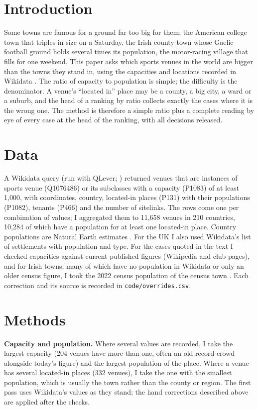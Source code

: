 \documentclass[11pt,a4paper]{article}
\begin{document}
\section{Introduction}
Some towns are famous for a ground far too big for them: the American college town that triples in size on a Saturday, the Irish county town whose Gaelic football ground holds several times its population, the motor-racing village that fills for one weekend. This paper asks which sports venues in the world are bigger than the towns they stand in, using the capacities and locations recorded in Wikidata \citep{vrandecic2014}. The ratio of capacity to population is simple; the difficulty is the denominator. A venue's ``located in'' place may be a county, a big city, a ward or a suburb, and the head of a ranking by ratio collects exactly the cases where it is the wrong one. The method is therefore a simple ratio plus a complete reading by eye of every case at the head of the ranking, with all decisions released.

\section{Data}
A Wikidata query (run with QLever; \citealt{bast2017}) returned venues that are instances of sports venue (Q1076486) or its subclasses with a capacity (P1083) of at least 1,000, with coordinates, country, located-in places (P131) with their populations (P1082), tenants (P466) and the number of sitelinks. The rows come one per combination of values; I aggregated them to 11,658 venues in 210 countries, 10,284 of which have a population for at least one located-in place. Country populations are Natural Earth estimates \citep{naturalearth}. For the UK I also used Wikidata's list of settlements with population and type. For the cases quoted in the text I checked capacities against current published figures (Wikipedia and club pages), and for Irish towns, many of which have no population in Wikidata or only an older census figure, I took the 2022 census population of the census town \citep{cso2022}. Each correction and its source is recorded in \texttt{code/overrides.csv}.

\section{Methods}
\textbf{Capacity and population.} Where several values are recorded, I take the largest capacity (204 venues have more than one, often an old record crowd alongside today's figure) and the largest population of the place. Where a venue has several located-in places (332 venues), I take the one with the smallest population, which is usually the town rather than the county or region. The first pass uses Wikidata's values as they stand; the hand corrections described above are applied after the checks.
\end{document}
